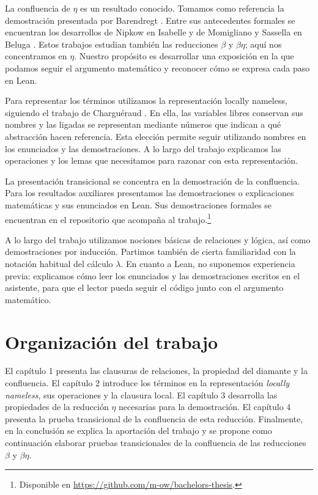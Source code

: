 \documentclass[
  spanish,
  letterpaper,
  DIV=11,
  numbers=noendperiod]{scrreprt}
\theoremstyle{remark}
\begin{document}
La confluencia de \(\eta\) es un resultado conocido. Tomamos como
referencia la demostración presentada por Barendregt
\autocite{barendregt1984}. Entre sus antecedentes formales se encuentran
los desarrollos de Nipkow en Isabelle \autocite{nipkow2001} y de
Momigliano y Sassella en Beluga \autocite{momigliano2024}. Estos
trabajos estudian también las reducciones \(\beta\) y \(\beta\eta\);
aquí nos concentramos en \(\eta\). Nuestro propósito es desarrollar una
exposición en la que podamos seguir el argumento matemático y reconocer
cómo se expresa cada paso en Lean.

Para representar los términos utilizamos la representación locally
nameless, siguiendo el trabajo de Charguéraud
\autocite{chargueraud2012}. En ella, las variables libres conservan sus
nombres y las ligadas se representan mediante números que indican a qué
abstracción hacen referencia. Esta elección permite seguir utilizando
nombres en los enunciados y las demostraciones. A lo largo del trabajo
explicamos las operaciones y los lemas que necesitamos para razonar con
esta representación.

La presentación transicional se concentra en la demostración de la
confluencia. Para los resultados auxiliares presentamos las
demostraciones o explicaciones matemáticas y sus enunciados en Lean. Sus
demostraciones formales se encuentran en el repositorio que acompaña al
trabajo.\footnote{Disponible en
  \url{https://github.com/m-ow/bachelors-thesis}.}

A lo largo del trabajo utilizamos nociones básicas de relaciones y
lógica, así como demostraciones por inducción. Partimos también de
cierta familiaridad con la notación habitual del cálculo \(\lambda\). En
cuanto a Lean, no suponemos experiencia previa: explicamos cómo leer los
enunciados y las demostraciones escritos en el asistente, para que el
lector pueda seguir el código junto con el argumento matemático.

\section*{Organización del trabajo}\label{organizaciuxf3n-del-trabajo}


El capítulo 1 presenta las clausuras de relaciones, la propiedad del
diamante y la confluencia. El capítulo 2 introduce los términos en la
representación \emph{locally nameless}, sus operaciones y la clausura
local. El capítulo 3 desarrolla las propiedades de la reducción \(\eta\)
necesarias para la demostración. El capítulo 4 presenta la prueba
transicional de la confluencia de esta reducción. Finalmente, en la
conclusión se explica la aportación del trabajo y se propone como
continuación elaborar pruebas transicionales de la confluencia de las
reducciones \(\beta\) y \(\beta\eta\).
\end{document}

